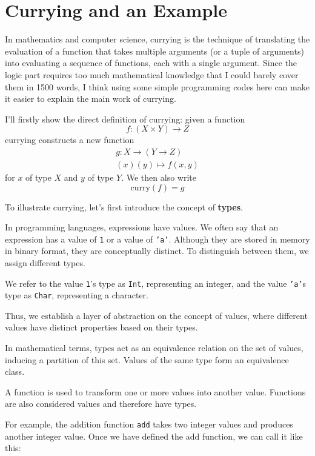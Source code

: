 \section{Currying and an Example}
In mathematics and computer science, currying\cite{currying} is the technique of translating the evaluation of a function that takes multiple arguments (or a tuple of arguments) into evaluating a sequence of functions, each with a single argument.
Since the logic part requires too much mathematical knowledge that I could barely cover them in 1500 words, I think using some simple programming codes here can make it easier to explain the main work of currying.

I'll firstly show the direct definition of currying:
given a function 
\[
    f: (X \times Y) \rightarrow Z    
\]
currying constructs a new function
\[
\begin{aligned}
    g: X \rightarrow (Y \rightarrow Z) \\
    (x)(y) \mapsto f(x, y)
\end{aligned}
\]
for ${x}$ of type ${\displaystyle X}$ and ${y}$ of type ${\displaystyle Y}$. We then also write
\[
    \text{curry}(f) = g    
\]

To illustrate currying, let's first introduce the concept of \textbf{types}.

In programming languages, expressions have values. We often say that an expression has a value of \texttt{1} or a value of \texttt{'a'}. Although they are stored in memory in binary format, they are conceptually distinct. To distinguish between them, we assign different types.

We refer to the value \texttt{1}'s type as \texttt{Int}, representing an integer, and the value \texttt{'a'}s type as \texttt{Char}, representing a character.

Thus, we establish a layer of abstraction on the concept of values, where different values have distinct properties based on their types.

In mathematical terms, types act as an equivalence relation on the set of values, inducing a partition of this set. Values of the same type form an equivalence class.

A function is used to transform one or more values into another value. Functions are also considered values and therefore have types.

For example, the addition function \texttt{add} takes two integer values and produces another integer value. Once we have defined the add function, we can call it like this:

